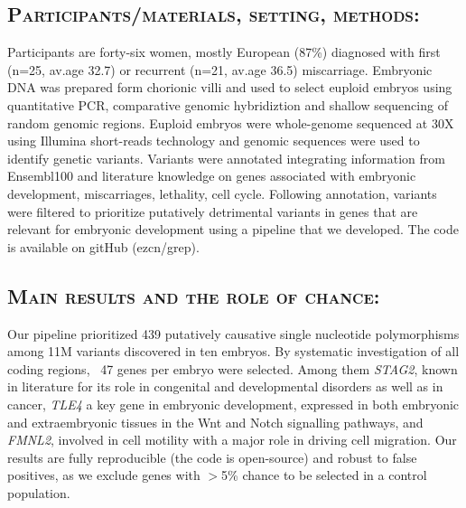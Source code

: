 \subsection*{\textsc{Participants/materials, setting, methods:}} %
Participants are forty-six women, mostly European (87\%) diagnosed with first (n=25, av.age 32.7) or recurrent (n=21, av.age 36.5) miscarriage. Embryonic DNA was prepared form chorionic villi and used to select euploid embryos using quantitative PCR, comparative genomic hybridiztion and shallow sequencing of random genomic regions. Euploid embryos were whole-genome sequenced at 30X using Illumina short-reads technology and genomic sequences were used to identify genetic variants. Variants were annotated integrating information from Ensembl100 and literature knowledge on genes associated with embryonic development, miscarriages, lethality, cell cycle. Following annotation, variants were filtered to prioritize putatively detrimental variants in genes that are relevant for embryonic development using a pipeline that we developed. The code is available on gitHub (ezcn/grep).

\subsection*{\textsc{Main results and the role of chance:}} 
Our pipeline prioritized 439 putatively causative single nucleotide polymorphisms among 11M variants discovered in ten embryos. By systematic investigation of all coding regions, ~47 genes per embryo were selected. Among them \textit{STAG2}, known in literature for its role in congenital and developmental disorders as well as in cancer, \textit{TLE4} a key gene in embryonic development, expressed in both embryonic and extraembryonic tissues in the Wnt and Notch signalling pathways, and \textit{FMNL2}, involved in cell motility with a major role in driving cell migration. Our results are fully reproducible (the code is open-source) and robust to false positives, as we exclude genes with $>$5\% chance to be selected in a control population.  

